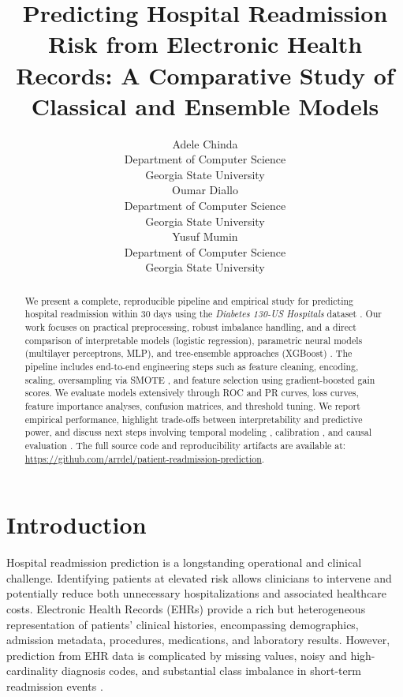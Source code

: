 \documentclass{article}
\title{Predicting Hospital Readmission Risk from Electronic Health Records: A Comparative Study of Classical and Ensemble Models} %
\author{%
Adele Chinda \\
Department of Computer Science \\
Georgia State University \\
\And
Oumar Diallo\\
Department of Computer Science \\
Georgia State University \\
\And
Yusuf Mumin \\
Department of Computer Science \\
Georgia State University \\
}
\begin{document}
\maketitle

\begin{abstract}
We present a complete, reproducible pipeline and empirical study for predicting hospital readmission within 30 days using the \emph{Diabetes 130-US Hospitals} dataset \cite{diabetes_130-us_hospitals_for_years_1999-2008_296}. Our work focuses on practical preprocessing, robust imbalance handling, and a direct comparison of interpretable models (logistic regression), parametric neural models (multilayer perceptrons, MLP), and tree-ensemble approaches (XGBoost) \cite{friedman2001gbm,breiman2001rf,chen2016xgboost}. The pipeline includes end-to-end engineering steps such as feature cleaning, encoding, scaling, oversampling via SMOTE \cite{chawla2002smote}, and feature selection using gradient-boosted gain scores. We evaluate models extensively through ROC and PR curves, loss curves, feature importance analyses, confusion matrices, and threshold tuning. We report empirical performance, highlight trade-offs between interpretability and predictive power, and discuss next steps involving temporal modeling \cite{choi2016doctor,vaswani2017attention}, calibration \cite{zadrozny2001calibration,platt1999probabilistic}, and causal evaluation \cite{pearl2009causality,shalit2017estimating}. The full source code and reproducibility artifacts are available at: \url{https://github.com/arrdel/patient-readmission-prediction}.
\end{abstract}


\section{Introduction}
Hospital readmission prediction is a longstanding operational and clinical challenge. Identifying patients at elevated risk allows clinicians to intervene and potentially reduce both unnecessary hospitalizations and associated healthcare costs. Electronic Health Records (EHRs) provide a rich but heterogeneous representation of patients’ clinical histories, encompassing demographics, admission metadata, procedures, medications, and laboratory results. However, prediction from EHR data is complicated by missing values, noisy and high-cardinality diagnosis codes, and substantial class imbalance in short-term readmission events \cite{hripcsak2015challenges}.
\end{document}
